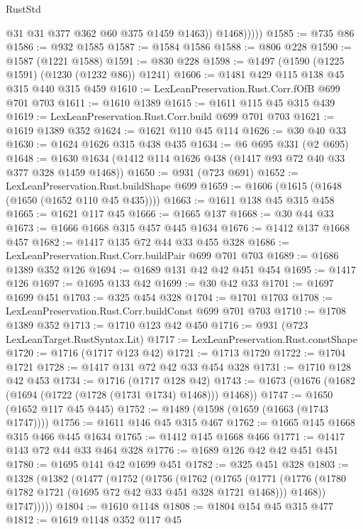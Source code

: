 \begin{lexlean}{RustStd}
\begin{coremodule}
{\begin{coremodule}
{{{{{{{{{{                  @31
                  @31
                  @377
                  @362
                  @60
                  @375
                  @1459
                  @1463))
              @1468)))))
@1585 := @735 @86
@1586 := @932 @1585
@1587 := @1584 @1586
@1588 := @806 @228
@1590 := @1587 (@1221 @1588)
@1591 := @830 @228
@1598 := @1497 (@1590 (@1225 @1591) (@1230 (@1232 @86)) @1241)
@1606 := @1481 @429 @115 @138 @45 @315 @440 @315 @459
@1610 := LexLeanPreservation.Rust.Corr.fOfB @699 @701 @703
@1611 := @1610 @1389
@1615 := @1611 @115 @45 @315 @439
@1619 := LexLeanPreservation.Rust.Corr.build @699 @701 @703
@1621 := @1619 @1389 @352
@1624 := @1621 @110 @45 @114
@1626 := @30 @40 @33
@1630 := @1624 @1626 @315 @438 @435
@1634 := @6 @695 @331 (@2 @695)
@1648 := @1630 @1634 (@1412 @114 @1626 @438 (@1417 @93 @72 @40 @33 @377 @328 @1459 @1468))
@1650 := @931 (@723 @691)
@1652 := LexLeanPreservation.Rust.buildShape @699
@1659 := @1606 (@1615 (@1648 (@1650 (@1652 @110 @45 @435))))
@1663 := @1611 @138 @45 @315 @458
@1665 := @1621 @117 @45
@1666 := @1665 @137
@1668 := @30 @44 @33
@1673 := @1666 @1668 @315 @457 @445 @1634
@1676 := @1412 @137 @1668 @457
@1682 := @1417 @135 @72 @44 @33 @455 @328
@1686 := LexLeanPreservation.Rust.Corr.buildPair @699 @701 @703
@1689 := @1686 @1389 @352 @126
@1694 := @1689 @131 @42 @42 @451 @454
@1695 := @1417 @126
@1697 := @1695 @133 @42
@1699 := @30 @42 @33
@1701 := @1697 @1699 @451
@1703 := @325 @454 @328
@1704 := @1701 @1703
@1708 := LexLeanPreservation.Rust.Corr.buildConst @699 @701 @703
@1710 := @1708 @1389 @352
@1713 := @1710 @123 @42 @450
@1716 := @931 (@723 LexLeanTarget.RustSyntax.Lit)
@1717 := LexLeanPreservation.Rust.constShape
@1720 := @1716 (@1717 @123 @42)
@1721 := @1713 @1720
@1722 := @1704 @1721
@1728 := @1417 @131 @72 @42 @33 @454 @328
@1731 := @1710 @128 @42 @453
@1734 := @1716 (@1717 @128 @42)
@1743 := @1673 (@1676 (@1682 (@1694 (@1722 (@1728 (@1731 @1734) @1468))) @1468))
@1747 := @1650 (@1652 @117 @45 @445)
@1752 := @1489 (@1598 (@1659 (@1663 (@1743 @1747))))
@1756 := @1611 @146 @45 @315 @467
@1762 := @1665 @145 @1668 @315 @466 @445 @1634
@1765 := @1412 @145 @1668 @466
@1771 := @1417 @143 @72 @44 @33 @464 @328
@1776 := @1689 @126 @42 @42 @451 @451
@1780 := @1695 @141 @42 @1699 @451
@1782 := @325 @451 @328
@1803 := @1328
    (@1382
      (@1477
        (@1752
          (@1756
            (@1762
              (@1765
                (@1771 (@1776 (@1780 @1782 @1721 (@1695 @72 @42 @33 @451 @328 @1721 @1468))) @1468))
              @1747)))))
@1804 := @1610 @1148
@1808 := @1804 @154 @45 @315 @477
@1812 := @1619 @1148 @352 @117 @45
}}}}}}}}}}
\end{coremodule}}
\end{coremodule}
\end{lexlean}

